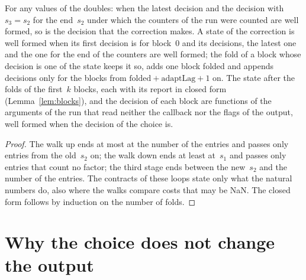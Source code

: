 \begin{lemma}\label{lem:correction}
  \leanok
  For any values of the doubles: when the latest decision and the decision with $s_3 = s_2$ for the
  end~$s_2$ under which the counters of the run were counted are well formed, so is the decision
  that the correction makes. A state of the correction is well formed when its first decision is for
  block~$0$ and its decisions, the latest one and the one for the end of the counters are well
  formed; the fold of a block whose decision is one of the state keeps it so, adds one block folded
  and appends decisions only for the blocks from $\mathrm{folded} + \mathrm{adaptLag} + 1$ on. The
  state after the folds of the first~$k$ blocks, each with its report in closed form
  (Lemma~\ref{lem:blocks}), and the decision of each block are functions of the arguments of the
  run that read neither the callback nor the flags of the output, well formed when the decision of
  the choice is.
\end{lemma}

\begin{proof}
  \leanok
  The walk up ends at most at the number of the entries and passes only entries from the old~$s_2$
  on; the walk down ends at least at~$s_1$ and passes only entries that count no factor; the third
  stage ends between the new~$s_2$ and the number of the entries. The contracts of these loops
  state only what the natural numbers do, also where the walks compare costs that may be NaN. The
  closed form follows by induction on the number of folds.
\end{proof}

\section{Why the choice does not change the output}\label{sec:moduliOutput}

